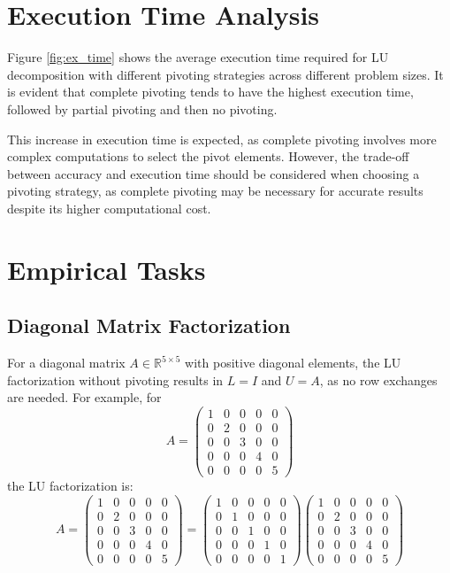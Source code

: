 \documentclass{article}
\begin{document}
\section{Execution Time Analysis}

Figure \ref{fig:ex_time} shows the average execution time required for LU decomposition with different pivoting strategies across different problem sizes. It is evident that complete pivoting tends to have the highest execution time, followed by partial pivoting and then no pivoting.

This increase in execution time is expected, as complete pivoting involves more complex computations to select the pivot elements. However, the trade-off between accuracy and execution time should be considered when choosing a pivoting strategy, as complete pivoting may be necessary for accurate results despite its higher computational cost.


\section{Empirical Tasks}

\subsection{Diagonal Matrix Factorization}
For a diagonal matrix \( A \in \mathbb{R}^{5 \times 5} \) with positive diagonal elements, the LU factorization without pivoting results in \( L = I \) and \( U = A \), as no row exchanges are needed. For example, for
\[ A = \begin{pmatrix} 1 & 0 & 0 & 0 & 0 \\ 0 & 2 & 0 & 0 & 0 \\ 0 & 0 & 3 & 0 & 0 \\ 0 & 0 & 0 & 4 & 0 \\ 0 & 0 & 0 & 0 & 5 \end{pmatrix} \]
the LU factorization is:
\[ A = \begin{pmatrix} 1 & 0 & 0 & 0 & 0 \\ 0 & 2 & 0 & 0 & 0 \\ 0 & 0 & 3 & 0 & 0 \\ 0 & 0 & 0 & 4 & 0 \\ 0 & 0 & 0 & 0 & 5 \end{pmatrix} = \begin{pmatrix} 1 & 0 & 0 & 0 & 0 \\ 0 & 1 & 0 & 0 & 0 \\ 0 & 0 & 1 & 0 & 0 \\ 0 & 0 & 0 & 1 & 0 \\ 0 & 0 & 0 & 0 & 1 \end{pmatrix} \begin{pmatrix} 1 & 0 & 0 & 0 & 0 \\ 0 & 2 & 0 & 0 & 0 \\ 0 & 0 & 3 & 0 & 0 \\ 0 & 0 & 0 & 4 & 0 \\ 0 & 0 & 0 & 0 & 5 \end{pmatrix} \]
\end{document}
